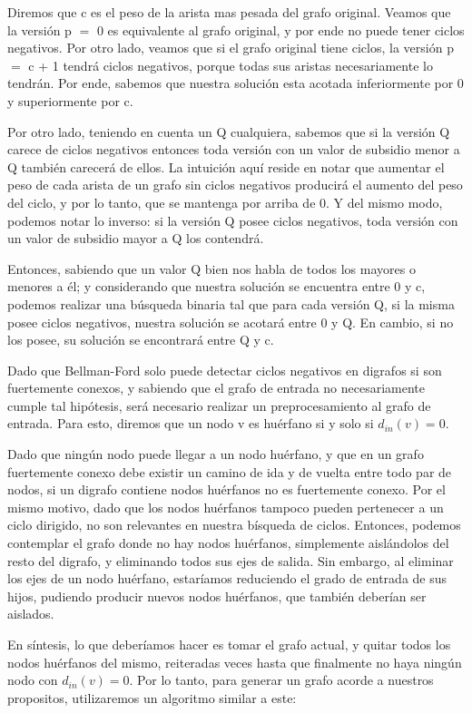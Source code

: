 Diremos que c es el peso de la arista mas pesada del grafo original. Veamos que la versión p $=$ 0 es equivalente al grafo original, y por ende no puede tener ciclos negativos. Por otro lado, veamos que si el grafo original tiene ciclos, la versión p $=$ c + 1 tendrá ciclos negativos, porque todas sus aristas necesariamente lo tendrán. Por ende, sabemos que nuestra solución esta acotada inferiormente por 0 y superiormente por c.

Por otro lado, teniendo en cuenta un Q cualquiera, sabemos que si la versión Q carece de ciclos negativos entonces toda versión con un valor de subsidio menor a Q también carecerá de ellos. La intuición aquí reside en notar que aumentar el peso de cada arista de un grafo sin ciclos negativos producirá el aumento del peso del ciclo, y por lo tanto, que se mantenga por arriba de 0. Y del mismo modo, podemos notar lo inverso: si la versión Q posee ciclos negativos, toda versión con un valor de subsidio mayor a Q los contendrá.

Entonces, sabiendo que un valor Q bien nos habla de todos los mayores o menores a él; y considerando que nuestra solución se encuentra entre 0 y c, podemos realizar una búsqueda binaria tal que para cada versión Q, si la misma posee ciclos negativos, nuestra solución se acotará entre 0 y Q. En cambio, si no los posee, su solución se encontrará entre Q y c.

Dado que Bellman-Ford solo puede detectar ciclos negativos en digrafos si son fuertemente conexos, y sabiendo que el grafo de entrada no necesariamente cumple tal hipótesis, será necesario realizar un preprocesamiento al grafo de entrada. Para esto, diremos que un nodo v es huérfano si y solo si $d_{in} (v) = 0$.

Dado que ningún nodo puede llegar a un nodo huérfano, y que en un grafo fuertemente conexo debe existir un camino de ida y de vuelta entre todo par de nodos, si un digrafo contiene nodos huérfanos no es fuertemente conexo. Por el mismo motivo, dado que los nodos huérfanos tampoco pueden pertenecer a un ciclo dirigido, no son relevantes en nuestra bísqueda de ciclos. Entonces, podemos contemplar el grafo donde no hay nodos huérfanos, simplemente aislándolos del resto del digrafo, y eliminando todos sus ejes de salida. Sin embargo, al eliminar los ejes de un nodo huérfano, estaríamos reduciendo el grado de entrada de sus hijos, pudiendo producir nuevos nodos huérfanos, que también deberían ser aislados.

En síntesis, lo que deberíamos hacer es tomar el grafo actual, y quitar todos los nodos huérfanos del mismo, reiteradas veces hasta que finalmente no haya ningún nodo con $d_{in} (v) = 0$. Por lo tanto, para generar un grafo acorde a nuestros propositos, utilizaremos un algoritmo similar a este:

